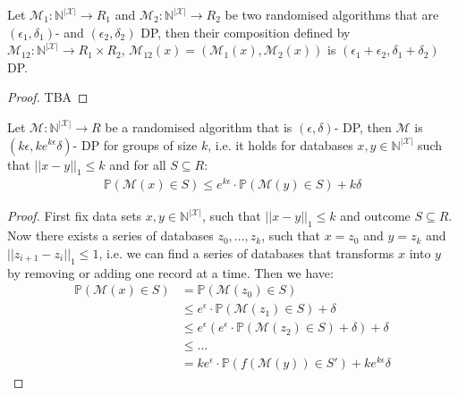 \begin{thm}
    Let $\mathcal{M}_1: \mathbb{N}^{|\mathcal{X}|} \rightarrow R_1$ and $\mathcal{M}_2: \mathbb{N}^{|\mathcal{X}|} \rightarrow R_2$ be two randomised algorithms that are $(\epsilon_1, \delta_1)$- and $(\epsilon_2, \delta_2)$ DP, then their composition defined by $\mathcal{M}_{12}: \mathbb{N}^{|\mathcal{X}|} \rightarrow R_1 \times R_2$, $\mathcal{M}_{12}(x)=(\mathcal{M}_{1}(x), \mathcal{M}_{2}(x))$ is $(\epsilon_1+\epsilon_2, \delta_1+\delta_2)$ DP.
\end{thm}
\begin{proof}
    TBA
\end{proof}

\begin{thm}
    Let $\mathcal{M}: \mathbb{N}^{|\mathcal{X}|} \rightarrow R$ be a randomised algorithm that is $(\epsilon, \delta)$- DP, then $\mathcal{M}$ is $(k\epsilon, k e^{k\epsilon} \delta)$- DP for groups of size $k$, i.e. it holds for databases $x,y \in \mathbb{N}^{|\mathcal{X}|}$ such that $||x-y||_1\le k$ and for all $S \subseteq R$:
    \begin{align}
        \mathbb{P}(\mathcal{M}(x) \in S) \le e^{k\epsilon} \cdot \mathbb{P}(\mathcal{M}(y) \in S) + k\delta 
    \end{align}
\end{thm}
\begin{proof}
    First fix data sets $x,y \in \mathbb{N}^{|\mathcal{X}|}$, such that $||x-y||_1\le k$ and outcome $S \subseteq R$. Now there exists a series of databases $z_0,..., z_k$, such that $x=z_0$ and $y=z_k$ and $|| z_{i+1} - z_i||_1 \le 1$, i.e. we can find a series of databases that transforms $x$ into $y$ by removing or adding one record at a time. Then we have:
    \begin{align}
        \mathbb{P}(\mathcal{M}(x)\in S) &= \mathbb{P}(\mathcal{M}(z_0)\in S) \nonumber \\
        &\le e^\epsilon \cdot \mathbb{P}(\mathcal{M}(z_1)\in S) + \delta \nonumber \\
        &\le e^\epsilon \left( e^\epsilon \cdot \mathbb{P}(\mathcal{M}(z_2)\in S) + \delta \right) + \delta \nonumber \\
        &\le ... \nonumber \\
        &= k e^\epsilon \cdot \mathbb{P}(f(\mathcal{M}(y))\in S') + k e^{k \epsilon} \delta
    \end{align}
\end{proof}



